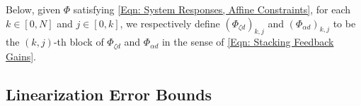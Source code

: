 \documentclass[letterpaper, 10 pt, conference]{ieeeconf}
\newcommand{\?}{\stackrel{?}{=}}
\newcommand{\param}{\theta}
\newcommand{\disturbance}{d}
\newcommand{\ratePGD}{\alpha}
\newcommand{\systemResponse}{\Phi}
\newcommand{\iterationHorizon}{N}
\newcommand{\state}{\zeta}
\newcommand{\outputNoise}{v}
\newcommand{\frank}[1]{{\textcolor[rgb]{0,0,1}{\textsf{[Frank: {#1}]}}}}
\newcommand{\antoine}[1]{{\textcolor[rgb]{1,0,0}{\textsf{[Antoine: {#1}]}}}}
\begin{document}
Below, given $\systemResponse$ satisfying \eqref{Eqn: System Responses, Affine Constraints}, for each $k \in [0, \iterationHorizon]$ and $j \in [0, k]$, we respectively define $(\systemResponse_{\state \disturbance})_{k,j}$ and $(\systemResponse_{\ratePGD \disturbance})_{k,j}$ to be the $(k, j)$-th block
of $\systemResponse_{\state \disturbance}$ and $\systemResponse_{\ratePGD \disturbance}$ in the sense of \eqref{Eqn: Stacking Feedback Gains}.






\subsection{Linearization Error Bounds}
\label{subsec: Linearization Error Bounds}
\end{document}
